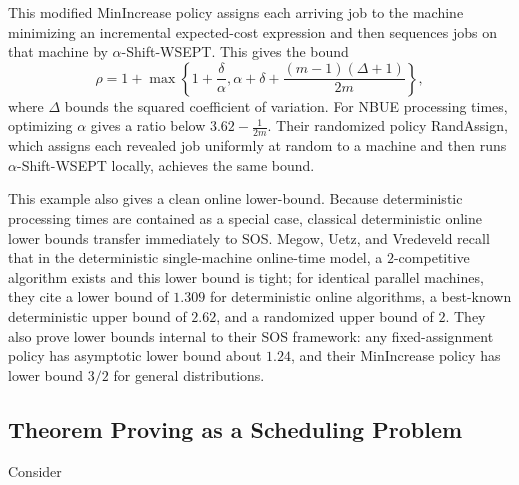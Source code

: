 This modified MinIncrease policy assigns each arriving job to the machine minimizing an incremental expected-cost expression and then sequences jobs on that machine by \(\alpha\)-Shift-WSEPT. This gives the bound
\[
\rho = 1+\max \left\{1+\frac{\delta}{\alpha}, \alpha+\delta+\frac{(m-1)(\Delta+1)}{2m}\right\},
\]
where \(\Delta\) bounds the squared coefficient of variation. For NBUE processing times, optimizing \(\alpha\) gives a ratio below \(3.62-\frac{1}{2m}\). Their randomized policy RandAssign, which assigns each revealed job uniformly at random to a machine and then runs \(\alpha\)-Shift-WSEPT locally, achieves the same bound.

This example also gives a clean online lower-bound. Because deterministic processing times are contained as a special case, classical deterministic online lower bounds transfer immediately to SOS. Megow, Uetz, and Vredeveld recall that in the deterministic single-machine online-time model, a \(2\)-competitive algorithm exists and this lower bound is tight; for identical parallel machines, they cite a lower bound of \(1.309\) for deterministic online algorithms, a best-known deterministic upper bound of \(2.62\), and a randomized upper bound of \(2\). They also prove lower bounds internal to their SOS framework: any fixed-assignment policy has asymptotic lower bound about \(1.24\), and their MinIncrease policy has lower bound \(3/2\) for general distributions. 


\subsection{Theorem Proving as a Scheduling Problem}

Consider
